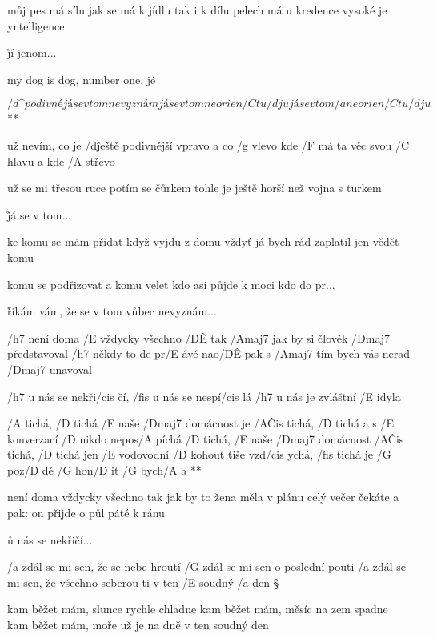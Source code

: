 můj pes má sílu
jak se má k jídlu tak i k dílu
pelech má u kredence
vysoké je yntelligence

\r jí jenom...

my dog is dog, number one, jé




\R  \[ /d\^{podivné} já se v tom nevyznám
    já se v tom neorien/C tu/d ju
    já se v tom /a neorien/C tu/d ju \] **

už nevím, co je /d\^{ještě podivnější} vpravo
a co /g vlevo
kde /F má ta věc svou /C hlavu
a kde /A střevo \s

už se mi třesou ruce
potím se čůrkem
tohle je ještě horší
než vojna s turkem

\r já se v tom...

ke komu se mám přidat
když vyjdu z domu
vždyť já bych rád zaplatil
jen vědět komu \s

komu se podřizovat
a komu velet
kdo asi půjde k moci
kdo do pr...

\r říkám vám, že se v tom vůbec nevyznám...




/h7 není doma /E vždycky všechno /D\^E tak
/Amaj7 jak by si člověk /Dmaj7 představoval
/h7 někdy to de pr/E ávě nao/D\^E pak
s /Amaj7 tím bych vás nerad /Dmaj7 unavoval

\R  /h7 u nás se nekři/cis čí, /fis u nás se nespí/cis lá
    /h7 u nás je zvláštní /E idyla

    /A tichá, /D tichá /E naše /Dmaj7 domácnost je /A\^{Cis} tichá, /D tichá
    a s /E konverzací /D nikdo nepos/A píchá
    /D tichá, /E naše /Dmaj7 domácnost /A\^{Cis} tichá, /D tichá
    jen /E vodovodní /D kohout tiše vzd/cis ychá, /fis tichá
    je /G poz/D dě /G hon/D it /G bych/A a **

není doma vždycky všechno tak
jak by to žena měla v plánu
celý večer čekáte a pak:
on přijde o půl páté k ránu

\r u nás se nekřičí...




/a zdál se mi sen, že se nebe hroutí
/G zdál se mi sen o poslední pouti
/a zdál se mi sen, že všechno seberou ti
v ten /E soudný /a den \S

kam běžet mám, slunce rychle chladne
kam běžet mám, měsíc na zem spadne
kam běžet mám, moře už je na dně
v ten soudný den \s

